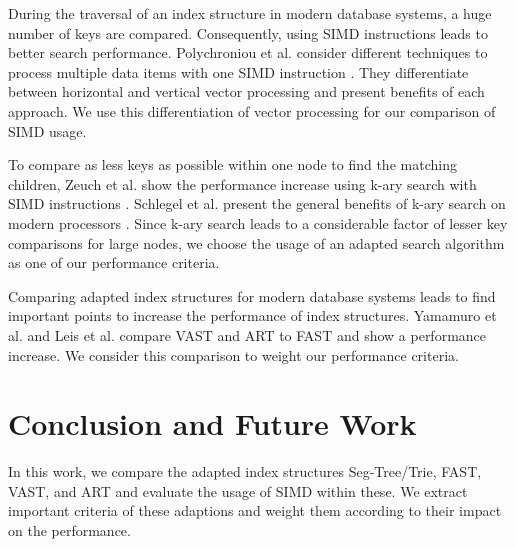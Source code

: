 \documentclass[conference]{IEEEtran}
\begin{document}
During the traversal of an index structure in modern database systems, a huge number of keys are compared. Consequently, using SIMD instructions leads to better search performance. Polychroniou et al. consider different techniques to process multiple data items with one SIMD instruction \cite{b7}. They differentiate between horizontal and vertical vector processing and present benefits of each approach. We use this differentiation of vector processing for our comparison of SIMD usage.  

To compare as less keys as possible within one node to find the matching children, Zeuch et al. show the performance increase using k-ary search with SIMD instructions \cite{b3}. Schlegel et al. present the general benefits of k-ary search on modern processors \cite{b14}. Since k-ary search leads to a considerable factor of lesser key comparisons for large nodes, we choose the usage of an adapted search algorithm as one of our performance criteria.

Comparing adapted index structures for modern database systems leads to find important points to increase the performance of index structures. Yamamuro et al. and Leis et al. compare VAST \cite{b5} and ART \cite{b4} to FAST and show a performance increase. We consider this comparison to weight our performance criteria.

\section{Conclusion and Future Work}


In this work, we compare the adapted index structures Seg-Tree/Trie, FAST, VAST, and ART and evaluate the usage of SIMD within these. We extract important criteria of these adaptions and weight them according to their impact on the performance.
\end{document}
